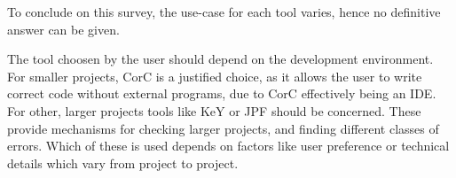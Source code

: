 To conclude on this survey, the use-case for each tool varies, hence no definitive answer can be given. 

The tool choosen by the user should depend on the development environment.
For smaller projects, CorC is a justified choice, as it allows the user to write correct code without external programs, due to CorC effectively being an IDE. 
For other, larger projects tools like KeY or JPF should be concerned. These provide mechanisms for checking larger projects, and finding different classes of errors. Which of these is used depends on factors like user preference or technical details which vary from project to project. 
